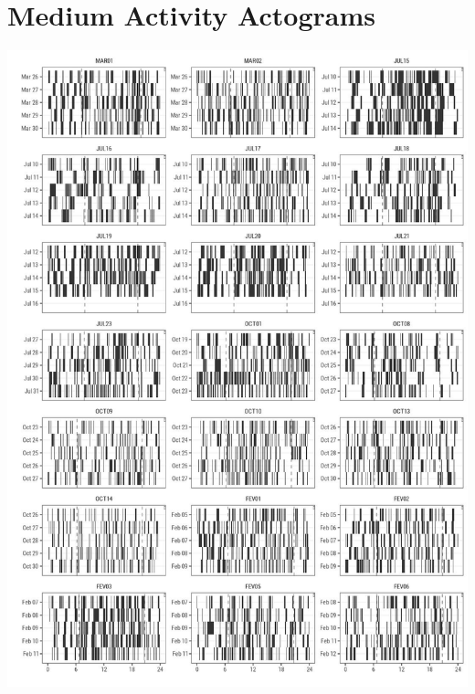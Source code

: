 \documentclass[english,msc,numbers,hidelinks]{coppe}
\begin{document}
  \hypertarget{medium-activity-actograms}{%
  \section{Medium Activity Actograms}\label{medium-activity-actograms}}
  \begin{center}\includegraphics[width=1\linewidth]{../04_figures/actograms/actograms_medium} \end{center}
\end{document}
